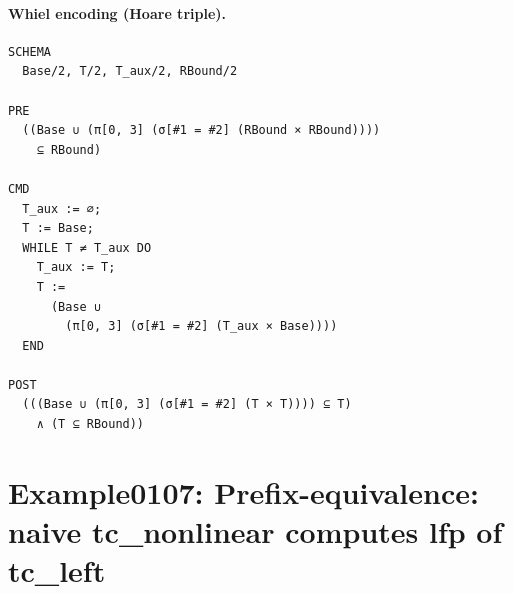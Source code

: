 \documentclass[10pt]{article}
\begin{document}
\paragraph{Whiel encoding (Hoare triple).}

\begin{Verbatim}[fontsize=\scriptsize,breaklines=true,breakanywhere=true,frame=single,framesep=1.5mm]
SCHEMA
  Base/2, T/2, T_aux/2, RBound/2

PRE
  ((Base ∪ (π[0, 3] (σ[#1 = #2] (RBound × RBound))))
    ⊆ RBound)

CMD
  T_aux := ∅;
  T := Base;
  WHILE T ≠ T_aux DO
    T_aux := T;
    T :=
      (Base ∪
        (π[0, 3] (σ[#1 = #2] (T_aux × Base))))
  END

POST
  (((Base ∪ (π[0, 3] (σ[#1 = #2] (T × T)))) ⊆ T)
    ∧ (T ⊆ RBound))
\end{Verbatim}

\Needspace{0.45\textheight}

\section{Example0107: Prefix-equivalence: naive tc\_nonlinear computes lfp of tc\_left}\label{case:Example0107}
\end{document}
